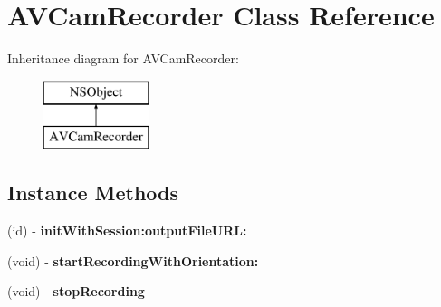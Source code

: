 \hypertarget{interface_a_v_cam_recorder}{}\section{A\+V\+Cam\+Recorder Class Reference}
\label{interface_a_v_cam_recorder}
Inheritance diagram for A\+V\+Cam\+Recorder\+:\begin{figure}[H]
\begin{center}
\leavevmode
\includegraphics[height=2.000000cm]{interface_a_v_cam_recorder}
\end{center}
\end{figure}
\subsection*{Instance Methods}
\begin{DoxyCompactItemize}
\item 
\hypertarget{interface_a_v_cam_recorder_aab7ddc6df6df255fcddbae8b29931a53}{}(id) -\/ {\bfseries init\+With\+Session\+:output\+File\+U\+R\+L\+:}\label{interface_a_v_cam_recorder_aab7ddc6df6df255fcddbae8b29931a53}

\item 
\hypertarget{interface_a_v_cam_recorder_af1963a9002b397ef8c48d5774d606c52}{}(void) -\/ {\bfseries start\+Recording\+With\+Orientation\+:}\label{interface_a_v_cam_recorder_af1963a9002b397ef8c48d5774d606c52}

\item 
\hypertarget{interface_a_v_cam_recorder_a029a87a2cb0d34cc9f1a78845e256ae3}{}(void) -\/ {\bfseries stop\+Recording}\label{interface_a_v_cam_recorder_a029a87a2cb0d34cc9f1a78845e256ae3}

\end{DoxyCompactItemize}
